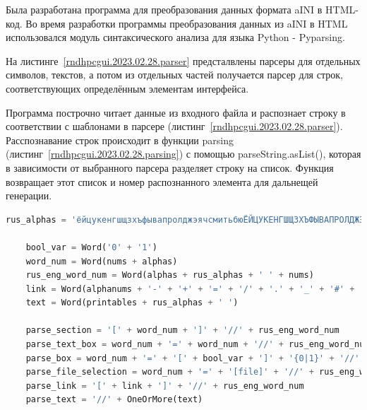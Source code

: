 \def\notedate{2023.02.28}
\def\currentauthor{Василян А.Р. (РК6-83Б)}



Была разработана программа для преобразования данных формата \textsf{aINI} в \textsf{HTML}-код.
Во время разработки программы преобразования данных из \textsf{aINI} в \textsf{HTML} использовался модуль синтаксического анализа для языка \textsf{Python} - \textsf{Pyparsing}. 


На листинге~\ref{rndhpcgui.2023.02.28.parser} предсталвлены парсеры для отдельных символов, текстов, а потом из отдельных частей получается парсер для строк, соответствующих определённым элементам интерфейса.


Программа построчно читает данные из входного файла и распознает строку в соответствии с шаблонами в парсере (листинг~\ref{rndhpcgui.2023.02.28.parser}). Расспознавание строк происходит в функции \textsf{parsing} (листинг~\ref{rndhpcgui.2023.02.28.parsing}) с помощью \textsf{parseString.asList()}, которая в зависимости от выбранного парсера разделяет строку на список. Функция возвращает этот список и номер распознанного элемента для дальнещей генерации.


\begin{lstlisting}[frame=single, label={rndhpcgui.2023.02.28.parser}, caption={Парсер}, language={Python}] 
	rus_alphas = 'ёйцукенгшщзхъфывапролджэячсмитьбюЁЙЦУКЕНГШЩЗХЪФЫВАПРОЛДЖЭЯЧСМИТЬБЮ'

	bool_var = Word('0' + '1')
	word_num = Word(nums + alphas)
	rus_eng_word_num = Word(alphas + rus_alphas + ' ' + nums)
	link = Word(alphanums + '-' + '+' + '=' + '/' + '.' + '_' + '#' + ':' + '&' + '?' + '%')
	text = Word(printables + rus_alphas + ' ')
	
	parse_section = '[' + word_num + ']' + '//' + rus_eng_word_num
	parse_text_box = word_num + '=' + word_num + '//' + rus_eng_word_num
	parse_box = word_num + '=' + '[' + bool_var + ']' + '{0|1}' + '//' + rus_eng_word_num
	parse_file_selection = word_num + '=' + '[file]' + '//' + rus_eng_word_num
	parse_link = '[' + link + ']' + '//' + rus_eng_word_num
	parse_text = '//' + OneOrMore(text)
\end{lstlisting}


